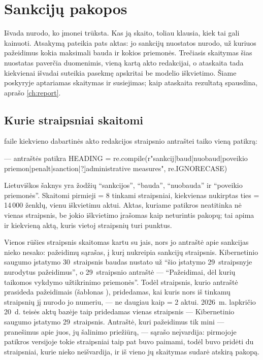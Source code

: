 \section{Sankcijų pakopos}\label{sec:obligations:sanctions}

Išvada nurodo, ko įmonei trūksta. Kas ją skaito, toliau klausia, kiek tai gali kainuoti. Atsakymą
pateikia pats aktas: jo sankcijų nuostatos nurodo, už kuriuos pažeidimus kokia maksimali bauda ir
kokios priemonės. Trečiasis skaitymas šias nuostatas paverčia duomenimis, vieną kartą akto
redakcijai, o ataskaita tada kiekvienai išvadai suteikia pasekmę apskritai be modelio
iškvietimo. Šiame poskyryje aptariamas skaitymas ir susiejimas; kaip ataskaita rezultatą
spausdina, aprašo \cref{ch:report}.

\subsection{Kurie straipsniai skaitomi}

 faile  kiekvieno dabartinės akto redakcijos
straipsnio antraštei taiko vieną patikrą:

\begin{codefile}{ --- antraštės patikra}
HEADING = re.compile(r"sankcij|baud|nuobaud|poveikio priemon|penalt|sanction|\bfines?\b|administrative measures",
                     re.IGNORECASE)
\end{codefile}

Lietuviškos šaknys yra žodžių \enquote{sankcijos}, \enquote{bauda}, \enquote{nuobauda} ir
\enquote{poveikio priemonės}. Skaitomi pirmieji  = 8 tinkami straipsniai,
kiekvienas nukirptas ties  = 14\,000 ženklų, vienu iškvietimu aktui. Aktas,
kuriame patikros neatitinka nė vienas straipsnis, be jokio iškvietimo įrašomas kaip neturintis
pakopų; tai apima ir kiekvieną aktą, kuris vietoj straipsnių turi punktus.

Vienos rūšies straipsnis skaitomas kartu su jais, nors jo antraštė apie sankcijas nieko
nesako: pažeidimų sąrašas, į kurį nukreipia sankcijų straipsnis. Kibernetinio saugumo
įstatymo 30~straipsnis baudas nustato už \enquote{šio įstatymo 29~straipsnyje nurodytus
pažeidimus}, o 29~straipsnio antraštė --- \enquote{Pažeidimai, dėl kurių taikomos vykdymo
užtikrinimo priemonės}. Todėl straipsnis, kurio antraštė prasideda pažeidimais (šablonas
), pridedamas, kai kuris nors iš tinkamų straipsnių jį nurodo jo numeriu, --- ne
daugiau kaip  = 2 aktui. 2026~m. lapkričio 20~d. teisės aktų bazėje taip
pridedamas vienas straipsnis --- Kibernetinio saugumo įstatymo 29~straipsnis. Antraštė, kuri
pažeidimus tik mini --- pranešimus apie juos, jų šalinimo priežiūrą, --- sąrašo neįvardija:
pirmojoje patikros versijoje tokie straipsniai taip pat buvo paimami, todėl buvo pridėti du
straipsniai, kurie nieko neišvardija, ir iš vieno jų skaitymas sudarė atskirą pakopą.

